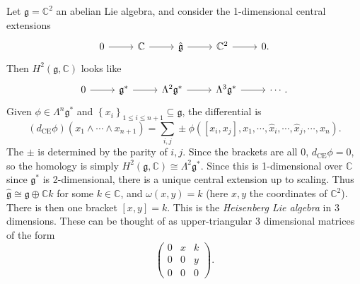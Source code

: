 \begin{example}
	Let $\mathfrak{g} =\mathbb{C} ^2$ an abelian Lie algebra, and consider the 1-dimensional central extensions
	\[\begin{tikzcd}[row sep = 2.5em, column sep = 2.5em]
		0\ar[r]  & \mathbb{C} \ar[r]  & \hat{\mathfrak{g} }\ar[r]  & \mathbb{C} ^2\ar[r]  & 0.
	\end{tikzcd}\]
	Then $H^2(\mathfrak{g} ,\mathbb{C} )$ looks like
	\[\begin{tikzcd}[row sep = 2.5em, column sep = 2.5em]
	0\ar[r]  & \mathfrak{g} ^* \ar[r]  & \Lambda ^2 \mathfrak{g} ^* \ar[r]  & \Lambda ^3 \mathfrak{g} ^*\ar[r]  & \cdots .
	\end{tikzcd}\]
	Given $\phi \in \Lambda ^n\mathfrak{g} ^*$ and $\left\{ x_i \right\} _{1\leq i\leq n+1} \subseteq \mathfrak{g} $, the differential is
	\[
		(d_{\mathrm{CE} } \phi )(x_1 \wedge \cdots \wedge x_{n+1} )=\sum_{i,j} \pm \phi ([x_i,x_j],x_1, \cdots ,\hat{x} _i,\cdots ,\hat{x} _j,\cdots ,x_n)
	.\]
	The $\pm$ is determined by the parity of $i,j$. Since the brackets are all 0, $d_{\mathrm{CE} } \phi =0$, so the homology is simply $H^2(\mathfrak{g} ,\mathbb{C} )\cong \Lambda ^2\mathfrak{g} ^*$. Since this is 1-dimensional over $\mathbb{C}$ since $\mathfrak{g} ^*$ is 2-dimensional, there is a unique central extension up to scaling. Thus $\hat{\mathfrak{g} } \cong \mathfrak{g} \oplus \mathbb{C} k$ for some $k\in\mathbb{C} $, and $\omega (x,y)=k$ (here $x,y$ the coordinates of $\mathbb{C} ^2$). There is then one bracket $[x,y]=k$. This is the \emph{Heisenberg Lie algebra} in 3 dimensions. These can be thought of as upper-triangular 3 dimensional matrices of the form
	\[
		\begin{pmatrix}
		0 & x & k \\
		0 & 0 & y \\
		0 & 0 & 0
		\end{pmatrix}
	.\]
\end{example}

